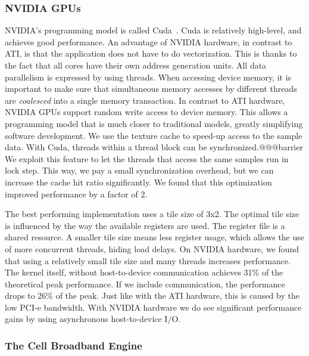 \documentclass{article}
\newcommand{\longversion}[1]{}
\begin{document}
\subsubsection{NVIDIA GPUs}

NVIDIA's programming model is called Cuda~\cite{cuda-manual}.
Cuda is relatively high-level, and achieves good performance.
An advantage of NVIDIA hardware, in contrast to ATI, is that the application does not have to do 
vectorization. This is thanks to the fact that all cores have their own address generation units. 
All data parallelism is expressed by using threads.
When
accessing device memory, it is important to make sure that
simultaneous memory accesses by different threads are \emph{coalesced}
into a single memory transaction.  In contrast to ATI hardware, NVIDIA
GPUs support random write access to device memory. This allows a
programming model that is much closer to traditional models, greatly
simplifying software development.
We use the
texture cache to speed-up access to the sample data. 
With Cuda, threads
within a thread block can be synchronized.@@@barrier  We exploit this feature to let
the threads that access the same samples run in lock step.  This way,
we pay a small synchronization overhead, but we can increase the cache hit
ratio significantly.  We found that this optimization improved performance by a factor of 2.

\longversion{
We also investigated the use of the per-multiprocessor shared memory as an
application-managed cache.  Others report good results with this
approach~\cite{gpu-cache}.  However, we found that, for our
application, the use of shared memory only led to performance
degradation.
}

The best performing
implementation uses a tile size of 3x2.
The optimal tile size is influenced by the way the available registers are used.
The register file is a shared resource. A smaller tile size means less register usage, 
which allows the use of more concurrent threads, hiding load delays.
On NVIDIA hardware, we found that using a relatively small tile size and many threads increases performance.
The kernel itself, without host-to-device communication achieves 31\%
of the theoretical peak performance.  If we include communication, the
performance drops to 26\% of the peak. Just like with the ATI
hardware, this is caused by the low PCI-e bandwidth.  With NVIDIA
hardware we do see significant performance gains by using asynchronous host-to-device I/O.


\subsubsection{The Cell Broadband Engine}
\end{document}

